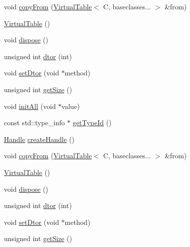 \begin{DoxyCompactItemize}
\item 
void \mbox{\hyperlink{structfakeit_1_1VirtualTable_a79d7c3b29e6da1ba1974c8c9d69fd7bd}{copy\+From}} (\mbox{\hyperlink{structfakeit_1_1VirtualTable}{Virtual\+Table}}$<$ C, baseclasses... $>$ \&from)
\item 
\mbox{\hyperlink{structfakeit_1_1VirtualTable_ae64da18818c25b107d8f9f2c615c4c37}{Virtual\+Table}} ()
\item 
void \mbox{\hyperlink{structfakeit_1_1VirtualTable_a58c2bfa93deb68aba5eced688c168e66}{dispose}} ()
\item 
unsigned int \mbox{\hyperlink{structfakeit_1_1VirtualTable_a7be0619d713b6ae2cac5722895176a14}{dtor}} (int)
\item 
void \mbox{\hyperlink{structfakeit_1_1VirtualTable_adee13076280ff9bd4c06b5f1e62d6708}{set\+Dtor}} (void $\ast$method)
\item 
unsigned int \mbox{\hyperlink{structfakeit_1_1VirtualTable_a014d48c976f89207564bf8d68b64a039}{get\+Size}} ()
\item 
void \mbox{\hyperlink{structfakeit_1_1VirtualTable_a261b66b33067b4425791762cb3786f20}{init\+All}} (void $\ast$value)
\item 
const std\+::type\+\_\+info $\ast$ \mbox{\hyperlink{structfakeit_1_1VirtualTable_a5ed35b122d5d06afced80ab93062bfa3}{get\+Type\+Id}} ()
\item 
\mbox{\hyperlink{classfakeit_1_1VirtualTable_1_1Handle}{Handle}} \mbox{\hyperlink{structfakeit_1_1VirtualTable_a616ff0e7567c8c5f368faff1dca949df}{create\+Handle}} ()
\item 
void \mbox{\hyperlink{structfakeit_1_1VirtualTable_a79d7c3b29e6da1ba1974c8c9d69fd7bd}{copy\+From}} (\mbox{\hyperlink{structfakeit_1_1VirtualTable}{Virtual\+Table}}$<$ C, baseclasses... $>$ \&from)
\item 
\mbox{\hyperlink{structfakeit_1_1VirtualTable_ae64da18818c25b107d8f9f2c615c4c37}{Virtual\+Table}} ()
\item 
void \mbox{\hyperlink{structfakeit_1_1VirtualTable_a58c2bfa93deb68aba5eced688c168e66}{dispose}} ()
\item 
unsigned int \mbox{\hyperlink{structfakeit_1_1VirtualTable_a7be0619d713b6ae2cac5722895176a14}{dtor}} (int)
\item 
void \mbox{\hyperlink{structfakeit_1_1VirtualTable_adee13076280ff9bd4c06b5f1e62d6708}{set\+Dtor}} (void $\ast$method)
\item 
unsigned int \mbox{\hyperlink{structfakeit_1_1VirtualTable_a014d48c976f89207564bf8d68b64a039}{get\+Size}} ()
\item 

\end{DoxyCompactItemize}
